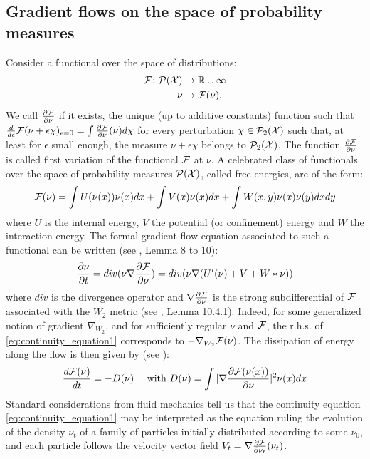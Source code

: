 \subsection{Gradient flows on the space of probability measures}\label{subsec:gradient_flows_functionals}


Consider a functional over the space of distributions:
\begin{align*}
{{\mathcal F}} \colon \mathcal{P}({{\mathcal X}}) &\to {{\mathbb R}} \cup \infty\\
\nu &\mapsto {{\mathcal F}}(\nu).
\end{align*}
We call $\frac{\partial{{{\mathcal F}}}}{\partial{\nu}}$ if it exists, the unique (up to additive constants) function such that $\frac{d}{d\epsilon}{{\mathcal F}}(\nu+\epsilon  \chi)_{\epsilon=0}=\int\frac{\partial{{{\mathcal F}}}}{\partial{\nu}}(\nu) d\chi$ for every perturbation $\chi \in \mathcal{P}_2({{\mathcal X}})$ such that, at least for $\epsilon$ small enough, the measure $\nu +\epsilon \chi$ belongs to $\mathcal{P}_2({{\mathcal X}})$. The function $\frac{\partial{{{\mathcal F}}}}{\partial{\nu}}$ is called first variation of the functional ${{\mathcal F}}$ at $\nu$. 
A celebrated class of functionals over the space of probability measures $\mathcal{P}({{\mathcal X}})$, called free energies, are of the form:
\begin{equation}\label{eq:lyapunov}
{{\mathcal F}}(\nu)=\int U(\nu(x)) \nu(x)dx + \int V(x)\nu(x)dx + \int W(x,y)\nu(x)\nu(y)dxdy
\end{equation}
where  $U$ is the internal energy, $V$ the potential (or confinement) energy and $W$ the
interaction energy. The formal gradient flow equation associated to such a functional can be written (see \cite{carrillo2006contractions}, Lemma 8 to 10):
\begin{equation}\label{eq:continuity_equation1}
\frac{\partial \nu}{\partial t}= div( \nu \nabla \frac{\partial {{\mathcal F}}}{\partial \nu})=div( \nu \nabla (U'(\nu) + V + W * \nu))
\end{equation}
where $div$ is the divergence operator and $\nabla \frac{\partial {{\mathcal F}}}{\partial \nu}$ is the strong subdifferential of ${{\mathcal F}}$ associated with the $W_2$ metric (see \cite{ambrosio2008gradient}, Lemma 10.4.1). Indeed, for some generalized notion of gradient $\nabla_{W_2}$, and for sufficiently regular $\nu$ and ${{\mathcal F}}$, the r.h.s. of \eqref{eq:continuity_equation1} corresponds to $-\nabla_{W_2}{{\mathcal F}}(\nu)$.
The dissipation of energy along the flow is then given by (see \cite{Villani:2004}): 
\begin{align}\label{eq:dissipation_energy}
       \frac{d {{\mathcal F}}(\nu)}{dt} =-D(\nu) \quad \text{ with } D(\nu)= \int |\nabla \frac{\partial {{\mathcal F}}(\nu(x))}{\partial \nu}|^2 \nu(x)dx
\end{align}
Standard considerations from fluid mechanics tell us that the continuity equation \eqref{eq:continuity_equation1} may be interpreted as the equation ruling the evolution of the density $\nu_t$ of a family of particles initially distributed according to some $\nu_0$, and each particle follows the velocity vector field $V_t=\nabla \frac{\partial{{{\mathcal F}}}}{\partial{\nu_t}}(\nu_t)$.

